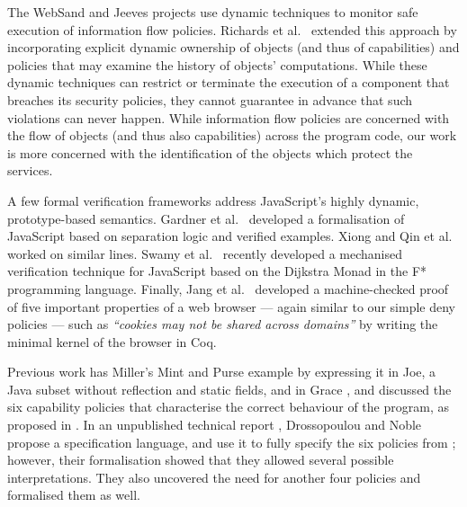  The WebSand
\cite{flowcaps11,sabelfeld-inlining2012} and Jeeves \cite{jeeves2012}
projects use dynamic techniques to monitor safe execution of information flow policies.
 Richards et al.\ \cite{FlacJS}   extended this approach by
incorporating explicit dynamic ownership of objects (and thus of
capabilities) and policies that may examine the history of objects'
computations. While these dynamic techniques can restrict or terminate
the execution of a component that breaches its security policies, they
cannot guarantee in advance that such violations can never happen.
While information flow policies are concerned with the flow of objects (and thus also capabilities)
across the program code, our work is more concerned with the identification of the objects which protect
the services.

A few formal verification frameworks  address JavaScript's highly
dynamic, prototype-based semantics. Gardner et al.\ \cite{Gardner12}
 developed a formalisation of JavaScript based on separation logic
and verified   examples. Xiong and Qin et
al.\ \cite{XiongPhd,Qin11}  worked on similar lines.
Swamy et al.\ \cite{JSDijkstraMonad}  recently
developed a mechanised verification technique for JavaScript based on
the Dijkstra Monad in the F* programming language.  Finally, Jang et
al.\ \cite{Quark} %
developed a machine-checked proof of
five important properties of a web browser --- again similar to our
simple deny policies --- such as
\textit{``cookies may not be shared across
  domains''} by writing the minimal kernel of the browser in Coq.

Previous work \cite{capeFTfJP,capeFTfJP14} has 
Miller's Mint and Purse example \cite{MillerPhD} by expressing it in
Joe, a Java subset without reflection and static fields, and in Grace
\cite{capeFTfJP14}, and discussed the six capability policies that
characterise the correct behaviour of the program, as proposed in
\cite{MillerPhD}.
 In an unpublished technical report
\cite{WAS-OOPSLA14-TR}, Drossopoulou and Noble propose a specification
language, and use
it to fully specify the six policies from \cite{MillerPhD}; however,
their formalisation showed that they allowed several possible
interpretations.  They also uncovered the need for another four policies
and formalised them as well.



